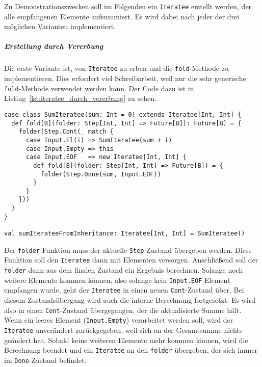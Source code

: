\documentclass[draft=false
              ,paper=a4
              ,twoside=false
              ,fontsize=11pt
              ,headsepline
              ,BCOR10mm
              ,DIV11
              ]{scrbook}
\begin{document}
Zu Demonstrationszwecken soll im Folgenden ein \lstinline|Iteratee| erstellt werden, der alle empfangenen Elemente aufsummiert.
Es wird dabei nach jeder der drei möglichen Varianten implementiert.

\subparagraph{Erstellung durch Vererbung} %
\label{subp:erstellung_durch_vererbung}\mbox{} %

Die erste Variante ist, von \lstinline|Iteratee| zu erben und die \lstinline|fold|-Methode zu implementieren.
Dies erfordert viel Schreibarbeit, weil nur die sehr generische \lstinline|fold|-Methode verwendet werden kann.
Der Code dazu ist in Listing~\ref{lst:iteratee_durch_vererbung} zu sehen.

\begin{lstlisting}[caption=Erstellung eines Iteratees durch Vererbung, label=lst:iteratee_durch_vererbung]
case class SumIteratee(sum: Int = 0) extends Iteratee[Int, Int] {
  def fold[B](folder: Step[Int, Int] => Future[B]): Future[B] = {
    folder(Step.Cont(_ match {
      case Input.El(i) => SumIteratee(sum + i)
      case Input.Empty => this
      case Input.EOF   => new Iteratee[Int, Int] {
        def fold[B](folder: Step[Int, Int] => Future[B]) = {
          folder(Step.Done(sum, Input.EOF))
        }
      }
    }))
  }
}

val sumIterateeFromInheritance: Iteratee[Int, Int] = SumIteratee()
\end{lstlisting}

Der \lstinline|folder|-Funktion muss der aktuelle \lstinline|Step|-Zustand übergeben werden.
Diese Funktion soll den \lstinline|Iteratee| dann mit Elementen versorgen.
Anschließend soll der \lstinline|folder| dann aus dem finalen Zustand ein Ergebnis berechnen.
Solange noch weitere Elemente kommen können, also solange kein \lstinline|Input.EOF|-Element empfangen wurde, geht der \lstinline|Iteratee| in einen neuen \lstinline|Cont|-Zustand über.
Bei diesem Zustandsübergang wird auch die interne Berechnung fortgesetzt.
Es wird also in einen \lstinline|Cont|-Zustand übergegangen, der die aktualisierte Summe hält.
Wenn ein leeres Element (\lstinline|Input.Empty|) verarbeitet werden soll, wird der \lstinline|Iteratee| unverändert zurückgegeben, weil sich an der Gesamtsumme nichts geändert hat.
Sobald keine weiteren Elemente mehr kommen können, wird die Berechnung beendet und ein \lstinline|Iteratee| an den \lstinline|folder| übergeben, der sich immer im \lstinline|Done|-Zustand befindet.

\end{document}
